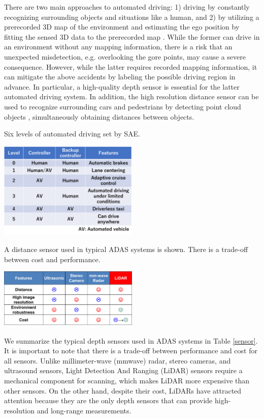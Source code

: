 \documentclass[paper]{ieice}
\begin{document}
There are two main approaches to automated driving: 1) driving by constantly recognizing surrounding objects and situations like a human\cite{tesla}, and 2) by utilizing a prerecorded 3D map of the environment and estimating the ego position by fitting the sensed 3D data to the prerecorded map \cite{montemerlo2008junior}. While the former can drive in an environment without any mapping information, there is a risk that an unexpected misdetection, e.g. overlooking the gore points, may cause a severe consequence. However, while the latter requires recorded mapping information, it can mitigate the above accidents by labeling the possible driving region in advance. 
In particular, a high-quality depth sensor is essential for the latter automated driving system. In addition, the high resolution distance sensor can be used to recognize surrounding cars and pedestrians by detecting point cloud objects \cite{lang2019pointpillars, qi2018frustum}, simultaneously obtaining distances between objects.

\begin{table}[!t]
\centering
\caption{Six levels of automated driving set by SAE.}
 \includegraphics[width=0.5\textwidth]{figs/ses.png}
\label{sae}
\end{table}

\begin{table}[!t]
\centering
\caption{A distance sensor used in typical ADAS systems is shown. There is a trade-off between cost and performance.}
 \includegraphics[width=0.5\textwidth]{figs/distancesensor.png}
\label{sensor}
\end{table}

We summarize the typical depth sensors used in ADAS systems in Table \ref{sensor}. It is important to note that there is a trade-off between performance and cost for all sensors.
Unlike millimeter-wave (mmwave) radar, stereo cameras, and ultrasound sensors, Light Detection And Ranging (LiDAR) sensors require a mechanical component for scanning, which makes LiDAR more expensive than other sensors. On the other hand, despite their cost, LiDARs have attracted attention because they are the only depth sensors that can provide high-resolution and long-range measurements.
\end{document}
